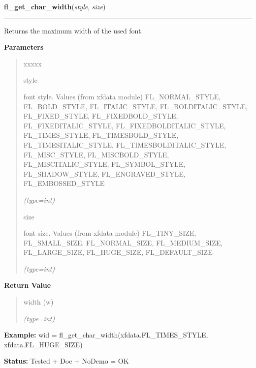 \hspace{.8\funcindent}\begin{boxedminipage}{\funcwidth}

    \raggedright \textbf{fl\_get\_char\_width}(\textit{style}, \textit{size})

    \vspace{-1.5ex}

    \rule{\textwidth}{0.5\fboxrule}
\setlength{\parskip}{2ex}
    Returns the maximum width of the used font.

\setlength{\parskip}{1ex}
      \textbf{Parameters}
      \vspace{-1ex}

      \begin{quote}
        \begin{Ventry}{xxxxx}

          \item[style]

          font style. Values (from xfdata module) FL\_NORMAL\_STYLE, 
          FL\_BOLD\_STYLE, FL\_ITALIC\_STYLE, FL\_BOLDITALIC\_STYLE, 
          FL\_FIXED\_STYLE, FL\_FIXEDBOLD\_STYLE, FL\_FIXEDITALIC\_STYLE, 
          FL\_FIXEDBOLDITALIC\_STYLE, FL\_TIMES\_STYLE, 
          FL\_TIMESBOLD\_STYLE, FL\_TIMESITALIC\_STYLE, 
          FL\_TIMESBOLDITALIC\_STYLE, FL\_MISC\_STYLE, FL\_MISCBOLD\_STYLE,
          FL\_MISCITALIC\_STYLE, FL\_SYMBOL\_STYLE, FL\_SHADOW\_STYLE, 
          FL\_ENGRAVED\_STYLE, FL\_EMBOSSED\_STYLE

            {\it (type=int)}

          \item[size]

          font size. Values (from xfdata module) FL\_TINY\_SIZE, 
          FL\_SMALL\_SIZE, FL\_NORMAL\_SIZE, FL\_MEDIUM\_SIZE, 
          FL\_LARGE\_SIZE, FL\_HUGE\_SIZE, FL\_DEFAULT\_SIZE

            {\it (type=int)}

        \end{Ventry}

      \end{quote}

      \textbf{Return Value}
    \vspace{-1ex}

      \begin{quote}
      width (w)

      {\it (type=int)}

      \end{quote}

\textbf{Example:} wid = fl\_get\_char\_width(xfdata.FL\_TIMES\_STYLE, xfdata.FL\_HUGE\_SIZE)



\textbf{Status:} Tested + Doc + NoDemo = OK



    \end{boxedminipage}

